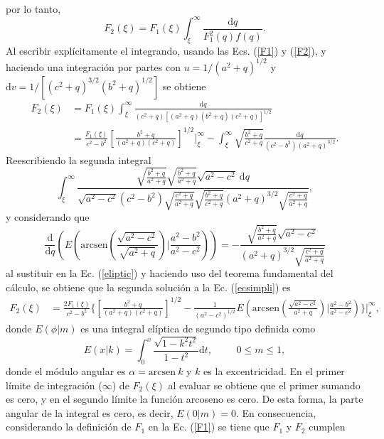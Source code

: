 por lo tanto, 
\begin{equation}
  F_2(\xi)=F_1(\xi)\int_{\xi}^{\infty}\frac{\text{d}q}{F_1^2(q)f(q)}.
  \label{F2}
\end{equation}
Al escribir explícitamente el integrando, usando las Ecs. (\ref{F1}) y (\ref{F2}), y haciendo una integración por partes con $u=1/(a^2+q)^{1/2}$ y $\text{d}v=1/[(c^2+q)^{3/2}(b^2+q)^{1/2}]$ se obtiene
\begin{align}
    F_2(\xi)&=F_1(\xi)\int_{\xi}^{\infty}\frac{\text{d}q}{(c^2+q)[(a^2+q)(b^2+q)(c^2+q)]^{1/2}}\nonumber\\
    &=\frac{F_1(\xi)}{c^2-b^2}\left[\frac{b^2+q}{(a^2+q)(c^2+q)}\right]^{1/2}\Bigg|_\xi^{\infty}-\int_\xi^{\infty}\sqrt{\frac{b^2+q}{c^2+q}}\frac{\text{d}q}{(c^2-b^2)(a^2+q)^{3/2}}.
\end{align}
Reescribiendo la segunda integral
\begin{equation}
	\int_\xi^{\infty}\frac{\sqrt{\frac{b^2+q}{a^2+q}}\sqrt{\frac{b^2+q}{a^2+q}}\sqrt{a^2-c^2}\:\text{d}q}{\sqrt{a^2-c^2}(c^2-b^2)\sqrt{\frac{c^2+q}{a^2+q}}\sqrt{\frac{b^2+q}{c^2+q}}(a^2+q)^{3/2}\sqrt{\frac{c^2+q}{a^2+q}}},\label{eliptic}
\end{equation}
y considerando que
\begin{equation*}
	\frac{\text{d}}{\text{d}q}\left(E\left(\mbox{arcsen}\left(\frac{\sqrt{a^2-c^2}}{\sqrt{a^2+q}}\right)\Bigg|\frac{a^2-b^2}{a^2-c^2}\right)\right)=-\frac{\sqrt{\frac{b^2+q}{a^2+q}}\sqrt{a^2-c^2}}{(a^2+q)^{3/2}\sqrt{\frac{c^2+q}{a^2+q}}}
\end{equation*}
al sustituir en la Ec. (\ref{eliptic}) y haciendo uso del teorema fundamental del cálculo, se obtiene que la segunda solución a la Ec. (\ref{ecsimpli}) es 
\begin{align}
    F_2(\xi)&=\frac{2F_1(\xi)}{c^2-b^2}\Bigg\{\left[\frac{b^2+q}{(a^2+q)(c^2+q)}\right]^{1/2}-\frac{1}{(a^2-c^2)^{1/2}}E\left(\mbox{arcsen}\left(\frac{\sqrt{a^2-c^2}}{a^2+q}\right)\Bigg|\frac{a^2-b^2}{a^2-c^2}\right)\Bigg\}\Bigg|_\xi^{\infty},
\end{align}
donde $E(\phi|m)$ es una integral elíptica de segundo tipo definida como \cite{Abramo}
\begin{equation}
    E(x|k)=\int_{0}^x\frac{\sqrt{1-k^2t^2}}{1-t^2}\text{d}t,\hspace{1cm}0\leq m\leq 1,
\end{equation}
donde el módulo angular es $\alpha=\mbox{arcsen}\:k$ y $k$ es la excentricidad. En el primer límite de integración ($\infty$) de $F_2(\xi)$ al evaluar se obtiene que el primer sumando es cero, y en el segundo límite la función arcoseno es cero. De esta forma, la parte angular de la integral es cero, es decir, $E(0|m)=0$. En consecuencia, considerando la definición de $F_1$ en la Ec. (\ref{F1}) se tiene que $F_1$ y $F_2$ cumplen

